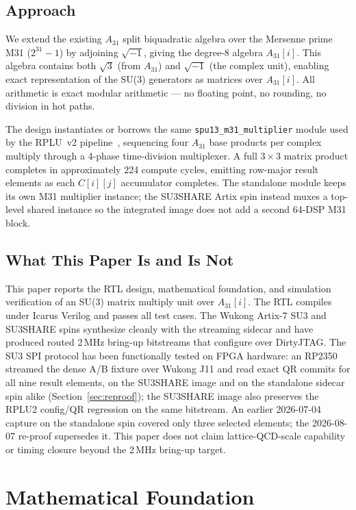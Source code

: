 \documentclass[conference]{IEEEtran}
\begin{document}
\subsection{Approach}

We extend the existing $A_{31}$ split biquadratic algebra over the Mersenne
prime M31 ($2^{31}-1$) by adjoining $\sqrt{-1}$, giving the degree-8 algebra
$A_{31}[i]$. This algebra contains both $\sqrt{3}$ (from $A_{31}$) and
$\sqrt{-1}$ (the complex unit), enabling exact representation of the SU(3)
generators as matrices over $A_{31}[i]$. All arithmetic is exact modular
arithmetic --- no floating point, no rounding, no division in hot paths.

The design instantiates or borrows the same \texttt{spu13\_m31\_multiplier}
module used by the RPLU~v2 pipeline~\cite{rplu2026}, sequencing four
$A_{31}$ base products per complex multiply through a 4-phase time-division
multiplexer. A full $3\times3$ matrix product completes in approximately 224
compute cycles, emitting row-major result elements as each $C[i][j]$
accumulator completes. The standalone module keeps its own M31 multiplier
instance; the SU3SHARE Artix spin instead muxes a top-level shared instance
so the integrated image does not add a second 64-DSP M31 block.

\subsection{What This Paper Is and Is Not}

This paper reports the RTL design, mathematical foundation, and simulation
verification of an SU(3) matrix multiply unit over $A_{31}[i]$. The RTL
compiles under Icarus Verilog and passes all test cases. The Wukong Artix-7
SU3 and SU3SHARE spins synthesize cleanly with the streaming sidecar and
have produced routed 2\,MHz bring-up bitstreams that configure over
DirtyJTAG. The SU3 SPI protocol has been functionally tested on FPGA
hardware: an RP2350 streamed the dense A/B fixture over Wukong J11 and read
exact QR commits for all nine result elements, on the SU3SHARE image and on
the standalone sidecar spin alike (Section~\ref{sec:reproof}); the SU3SHARE
image also preserves the RPLU2 config/QR regression on the same bitstream. An
earlier 2026-07-04 capture on the standalone spin covered only three selected
elements; the 2026-08-07 re-proof supersedes it.
This paper does not claim lattice-QCD-scale capability or timing closure
beyond the 2\,MHz bring-up target.

\section{Mathematical Foundation}
\end{document}
